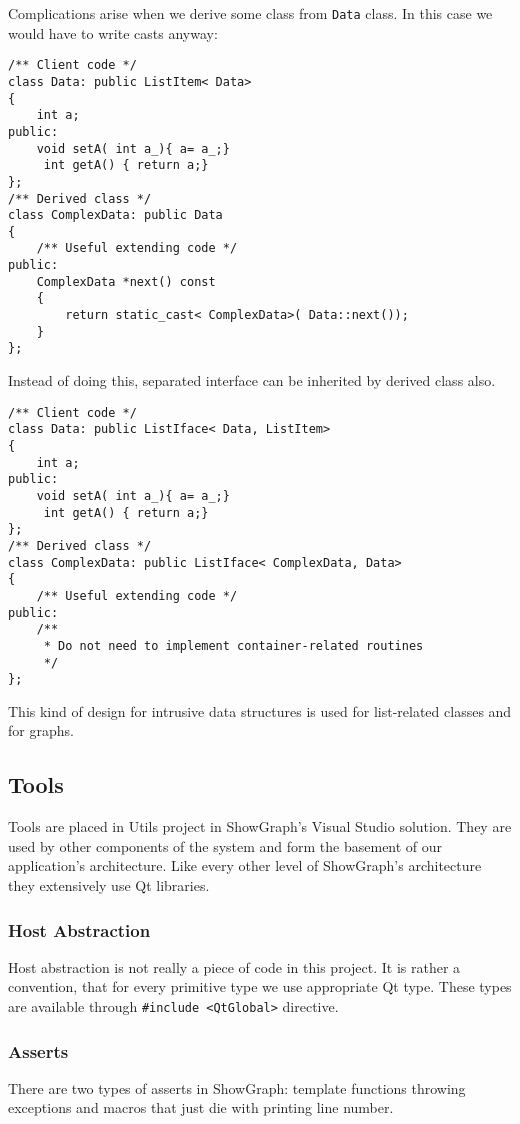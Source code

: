 \documentclass[11pt,a4paper]{article}
\begin{document}
Complications arise when we derive some class from \lstinline{Data} class. In this case we would have to write casts anyway:
\begin{lstlisting}
/** Client code */
class Data: public ListItem< Data> 
{
    int a;
public:
    void setA( int a_){ a= a_;}
	 int getA() { return a;}
};
/** Derived class */
class ComplexData: public Data
{
    /** Useful extending code */
public:
    ComplexData *next() const
    {
        return static_cast< ComplexData>( Data::next());
    }
};
\end{lstlisting}
Instead of doing this, separated interface can be inherited by derived class also.
\begin{lstlisting}
/** Client code */
class Data: public ListIface< Data, ListItem> 
{
    int a;
public:
    void setA( int a_){ a= a_;}
	 int getA() { return a;}
};
/** Derived class */
class ComplexData: public ListIface< ComplexData, Data>
{
    /** Useful extending code */
public:
    /** 
     * Do not need to implement container-related routines
     */
};
\end{lstlisting}

This kind of design for intrusive data structures is used for list-related classes and for graphs.

\subsection{Tools}
Tools are placed in Utils project in ShowGraph's Visual Studio solution. They are used by other components of the system and form the basement of our application's architecture. Like every other level of ShowGraph's architecture they extensively use Qt libraries.


\subsubsection{Host Abstraction}
Host abstraction is not really a piece of code in this project. It is rather a convention, that for every primitive type we use appropriate Qt type. These types are available through \lstinline{#include <QtGlobal>} directive.

\subsubsection{Asserts}
There are two types of asserts in ShowGraph: template functions throwing exceptions and macros that just die with printing line number.
\end{document}
